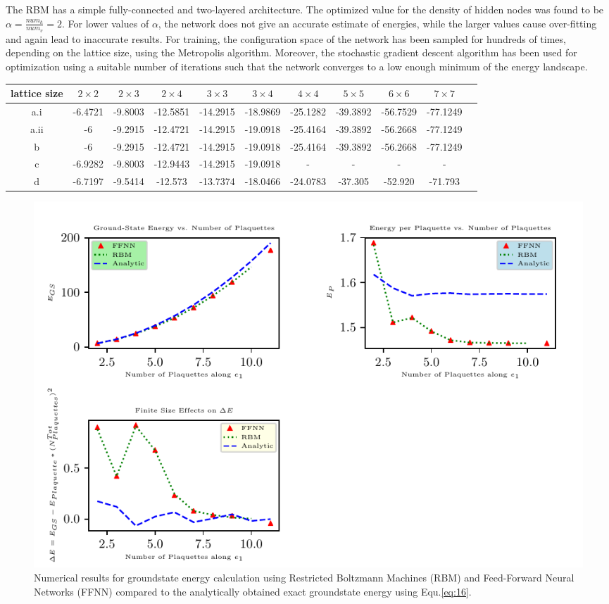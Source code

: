 \documentclass{article}
\begin{document}
The RBM has a simple fully-connected and two-layered architecture. The optimized value for the density of hidden nodes was found to be $\alpha = \frac{num_{h}}{num_{v}} = 2$. For lower values of $\alpha$, the network does not give an accurate estimate of energies, while the larger values cause over-fitting and again lead to inaccurate results. For training, the configuration space of the network has been sampled for hundreds of  times, depending on the lattice size, using the Metropolis algorithm. Moreover, the stochastic gradient descent algorithm has been used for optimization using a suitable number of iterations such that the network converges to a low enough minimum of the energy landscape.

\vspace{1cm}

{
\begin{tabular}[c]{|c||c|c|c|c|c|c|c|c|c|c|}
\hline
lattice size&$2\times2$    &$2\times3$    &$2\times4$     &$3\times3$     &$3\times4$     &$4\times4$     &$5\times5$     &$6\times6$     &$7\times7$ \\
\hline \hline
a.i         &-6.4721&-9.8003&-12.5851&-14.2915&-18.9869&-25.1282&-39.3892&-56.7529&-77.1249\\
\hline
a.ii        &-6     &-9.2915&-12.4721&-14.2915&-19.0918&-25.4164&-39.3892&-56.2668&-77.1249\\
\hline
b           &-6     &-9.2915&-12.4721&-14.2915&-19.0918&-25.4164&-39.3892&-56.2668&-77.1249\\
\hline
c           &-6.9282&-9.8003&-12.9443&-14.2915&-19.0918&-&-&-&-\\
\hline
d           &-6.7197&-9.5414&-12.573 &-13.7374&-18.0466&-24.0783&-37.305 &-52.920 &-71.793 \\ 
\hline
\end{tabular}
}
\begin{figure}[!htb]
	\centering
	\includegraphics[width=\textwidth]{./images/plots.pdf}
	\caption{\label{tab:r_space} Numerical results for groundstate energy calculation using Restricted Boltzmann Machines (RBM) 
	and Feed-Forward Neural Networks (FFNN) compared to the analytically obtained exact groundstate energy using Equ.\hspace{0.2mm}\ref{eq:16}.} 
\end{figure}
\end{document}
